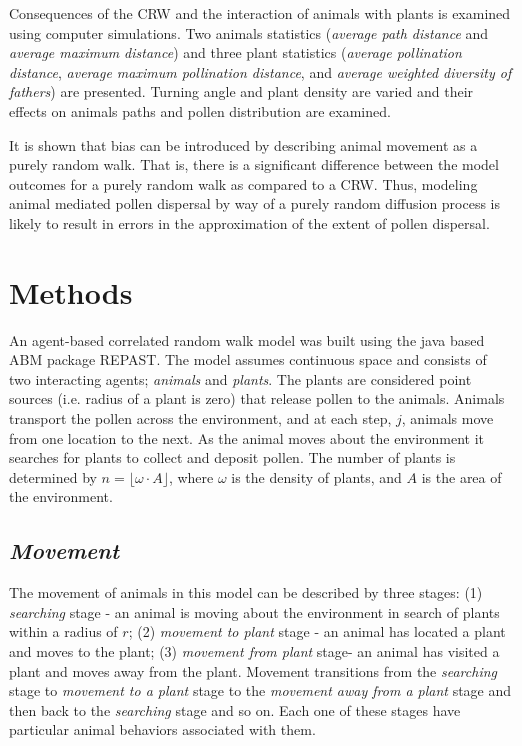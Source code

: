 \documentclass[preprint,12pt]{elsarticle}
\numberwithin{equation}{subsection}
\begin{document}
Consequences of the CRW and the interaction of animals with plants is examined
using computer simulations. Two animals statistics (\emph{average path distance}
and \emph{average maximum distance}) and three plant statistics (\emph{average
pollination distance}, \emph{average maximum pollination distance}, and
\emph{average weighted diversity of fathers}) are presented. Turning angle and
plant density are varied and their effects on animals paths and pollen
distribution are examined.

It is shown that bias can be introduced by describing animal movement as a
purely random walk. That is, there is a significant difference between the model
outcomes for a purely random walk as compared to a CRW. Thus, modeling animal
mediated pollen dispersal by way of a purely random diffusion process is likely
to result in errors in the approximation of the extent of pollen dispersal.


\section{{\bf Methods}}
An agent-based correlated random walk model was built using the java based ABM
package REPAST\cite{REPAST}. The model assumes continuous space and consists of
two interacting agents; \emph{animals} and \emph{plants}. The plants are
considered point sources (i.e. radius of a plant is zero) that release pollen to
the animals. Animals transport the pollen across the environment, and at each
step, $j$, animals move from one location to the next. As the animal moves about
the environment it searches for plants to collect and deposit pollen. The number
of plants is determined by $n = \lfloor\omega \cdot A\rfloor$, where $\omega$ is
the density of plants, and $A$ is the area of the environment.

\subsection{\emph{Movement}}
The movement of animals in this model can be described by three stages: (1)
\emph{searching} stage - an animal is moving about the environment in search of
plants within a radius of $r$; (2) \emph{movement to plant} stage - an animal
has located a plant and moves to the plant; (3) \emph{movement from plant}
stage- an animal has visited a plant and moves away from the plant. Movement
transitions from the \emph{searching} stage to \emph{movement to a plant} stage
to the \emph{movement away from a plant} stage and then back to the
\emph{searching} stage and so on. Each one of these stages have particular
animal behaviors associated with them.
\end{document}
